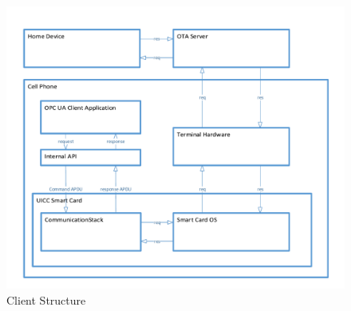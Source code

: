 \documentclass[]{llncs}
\begin{document}
 \begin{figure}
	\centering
	\includegraphics[width=1.0\textwidth]{clientStructure}
		\caption[ ]{Client Structure}
	\label{fig:clientStructure}
\end{figure}
\end{document}
